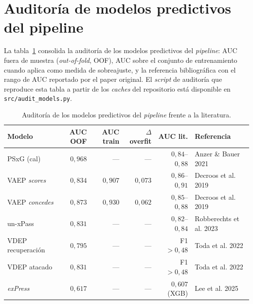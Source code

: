 \section{Auditoría de modelos predictivos del pipeline}
\label{anexo:val-audit-models}

La tabla~\ref{tab:audit-models} consolida la auditoría de los
modelos predictivos del \textit{pipeline}: AUC fuera de muestra
(\textit{out-of-fold}, OOF), AUC sobre el conjunto de entrenamiento
cuando aplica como medida de sobreajuste, y la referencia
bibliográfica con el rango de AUC reportado por el paper original.
El \textit{script} de auditoría que reproduce esta tabla a partir
de los \textit{caches} del repositorio está disponible en
\texttt{src/audit\_models.py}.

\begin{table}[h]
  \centering
  \footnotesize
  \caption{Auditoría de los modelos predictivos del \textit{pipeline}
    frente a la literatura.}
  \label{tab:audit-models}
  \begin{tabular}{lrrrrl}
    \toprule
    Modelo & AUC OOF & AUC train & $\Delta$ overfit & AUC lit. & Referencia \\
    \midrule
    PSxG (cal)            & $0{,}968$ & ---       & ---       & $0{,}84$--$0{,}88$ & Anzer \& Bauer 2021 \\
    VAEP \textit{scores}  & $0{,}834$ & $0{,}907$ & $0{,}073$ & $0{,}86$--$0{,}91$ & Decroos et al. 2019 \\
    VAEP \textit{concedes}& $0{,}873$ & $0{,}930$ & $0{,}062$ & $0{,}85$--$0{,}88$ & Decroos et al. 2019 \\
    un-xPass              & $0{,}831$ & ---       & ---       & $0{,}82$--$0{,}84$ & Robberechts et al. 2023 \\
    VDEP recuperación     & $0{,}795$ & ---       & ---       & F1 $>0{,}48$ & Toda et al. 2022 \\
    VDEP atacado          & $0{,}831$ & ---       & ---       & F1 $>0{,}48$ & Toda et al. 2022 \\
    \textit{exPress}      & $0{,}617$ & ---       & ---       & $0{,}607$ (XGB) & Lee et al. 2025 \\
    \bottomrule
  \end{tabular}
\end{table}

